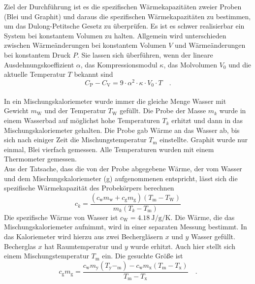 Ziel der Durchführung ist es die spezifischen Wärmekapazitäten zweier Proben (Blei und Graphit) und daraus  die spezifischen Wärmekapazitäten zu bestimmen, um das Dulong-Petitsche Gesetz zu überprüfen.
Es ist es schwer realisierbar ein System bei konstantem Volumen zu halten. Allgemein wird unterschieden zwischen Wärmeänderungen bei konstantem Volumen $V$ und Wärmeänderungen bei konstantem Druck $P$. Sie lassen sich überführen, wenn der lineare Ausdehnungskoeffizient $\alpha$, das Kompressionsmodul $\kappa$, das Molvolumen $V_0$ und die aktuelle Temperatur $T$ bekannt sind
\begin{equation}\label{konstanter Druck -> konstantem Volumen}
  C_\text{P} - C_\text{V} = 9 \cdot \alpha^2 \cdot \kappa \cdot V_0 \cdot T \quad.
\end{equation}  \\
In ein Mischungskaloriemeter wurde immer die gleiche Menge Wasser mit Gewicht $m_\text{W}$ und der Temperatur $T_\text{W}$ gefüllt.
Die Probe der Masse $m_k$ wurde in einem Wasserbad auf möglichst hohe Temperaturen $T_k$ erhitzt und dann in das Mischungskaloriemeter gehalten. Die Probe gab Wärme an das Wasser ab, bis sich nach einiger Zeit die Mischungstemperatur $T_\text{m}$ einstellte. Graphit wurde nur einmal, Blei vierfach gemessen. Alle Temperaturen wurden mit einem Thermometer gemessen.
\\
Aus der Tatsache, dass die von der Probe abgegebene Wärme, der vom Wasser und dem Mischungskaloriemeter (g) aufgenommenen entspricht, lässt sich die spezifische Wärmekapazität des Probekörpers berechnen
\begin{equation}\label{Warmekapazitat Stoff}
  c_k = \frac{(c_\text{w} m_\text{w} + c_\text{g} m_\text{g})(T_\text{m} - T_\text{W})}{m_k (T_k - T_\text{m})}
\end{equation}
Die spezifische Wärme von Wasser ist $c_\text{W} = \SI{4.18}{\joule\per\gram\per\kelvin}$. Die Wärme, die das Mischungskaloriemeter aufnimmt, wird in einer separaten Messung bestimmt. In das Kaloriemeter wird hierzu aus zwei Bechergläsern $x$ und $y$ Wasser gefüllt. Becherglas $x$ hat Raumtemperatur und $y$ wurde erhitzt. Auch hier stellt sich einem Mischungstemperatur $T_\text{m}$ ein. Die gesuchte Größe ist
\begin{equation}\label{Warmekapazitat Kalorimeter}
  c_\text{g} m_\text{g} = \frac{c_\text{w} m_\text{y}(T_\text{y}-_\text{m}) - c_\text{w} m_\text{x}(T_\text{m}-T_\text{x})}{T_\text{m} - T_\text{x}} \quad.
\end{equation}

